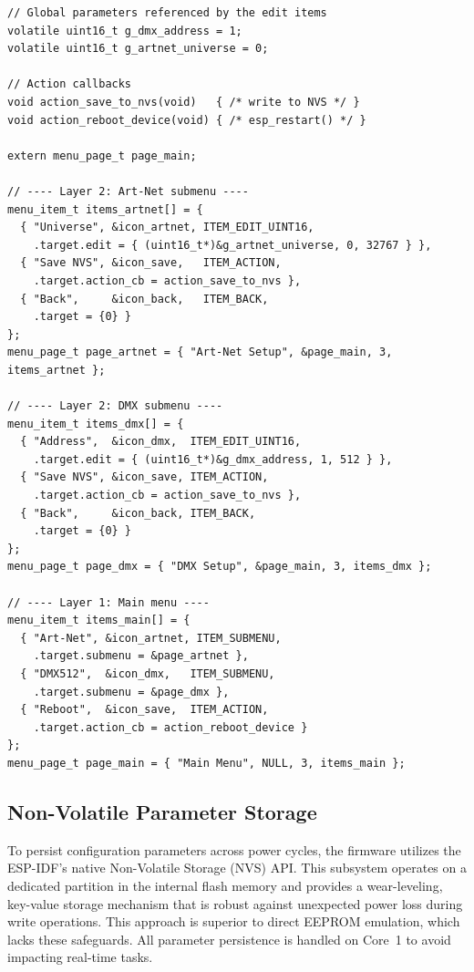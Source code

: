 \begin{longlisting}
\begin{verbatim}
// Global parameters referenced by the edit items
volatile uint16_t g_dmx_address = 1;
volatile uint16_t g_artnet_universe = 0;

// Action callbacks
void action_save_to_nvs(void)   { /* write to NVS */ }
void action_reboot_device(void) { /* esp_restart() */ }

extern menu_page_t page_main;

// ---- Layer 2: Art-Net submenu ----
menu_item_t items_artnet[] = {
  { "Universe", &icon_artnet, ITEM_EDIT_UINT16,
    .target.edit = { (uint16_t*)&g_artnet_universe, 0, 32767 } },
  { "Save NVS", &icon_save,   ITEM_ACTION,
    .target.action_cb = action_save_to_nvs },
  { "Back",     &icon_back,   ITEM_BACK,
    .target = {0} }
};
menu_page_t page_artnet = { "Art-Net Setup", &page_main, 3, items_artnet };

// ---- Layer 2: DMX submenu ----
menu_item_t items_dmx[] = {
  { "Address",  &icon_dmx,  ITEM_EDIT_UINT16,
    .target.edit = { (uint16_t*)&g_dmx_address, 1, 512 } },
  { "Save NVS", &icon_save, ITEM_ACTION,
    .target.action_cb = action_save_to_nvs },
  { "Back",     &icon_back, ITEM_BACK,
    .target = {0} }
};
menu_page_t page_dmx = { "DMX Setup", &page_main, 3, items_dmx };

// ---- Layer 1: Main menu ----
menu_item_t items_main[] = {
  { "Art-Net", &icon_artnet, ITEM_SUBMENU,
    .target.submenu = &page_artnet },
  { "DMX512",  &icon_dmx,   ITEM_SUBMENU,
    .target.submenu = &page_dmx },
  { "Reboot",  &icon_save,  ITEM_ACTION,
    .target.action_cb = action_reboot_device }
};
menu_page_t page_main = { "Main Menu", NULL, 3, items_main };
\end{verbatim}
\caption{Bottom-up instantiation of a two-level menu tree in flash memory.}
\label{lst:menu_tree}
\end{longlisting}

\subsection{Non-Volatile Parameter Storage}
\label{sec:nvs_storage}

To persist configuration parameters across power cycles, the firmware utilizes the ESP-IDF's native Non-Volatile Storage (\ac{NVS}) \ac{API}.
This subsystem operates on a dedicated partition in the internal flash memory and provides a wear-leveling, key-value storage mechanism that is robust against unexpected power loss during write operations.
This approach is superior to direct \ac{EEPROM} emulation, which lacks these safeguards.
All parameter persistence is handled on Core~1 to avoid impacting real-time tasks. \\

